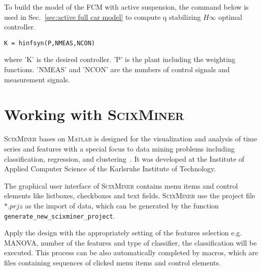 To build the model of the \ac{FCM} with active suspension, the command below is used in Sec.~\ref{sec:active full car model} to compute q stabilizing $H\infty$ optimal controller.

\begin{lstlisting}[caption={$H\infty$ controller design in Matlab},label=code:h8]
K = hinfsyn(P,NMEAS,NCON)
\end{lstlisting}

where 'K' is the desired controller.
%
'P' is the plant including the weighting functions.
%
'NMEAS' and 'NCON' are the numbers of control signals and measurement signals.

\section{Working with \textsc{ScixMiner}}

\textsc{ScixMiner} bases on \textsc{Matlab} is designed for the visualization and analysis of time series and features with a special focus to data mining problems including classification, regression, and clustering~\cite{SciXMiner}.
%
It was developed at the Institute of Applied Computer Science of the Karlsruhe Institute of Technology.

The graphical user interface of \textsc{ScixMiner} contains menu items and control elements like listboxes, checkboxes and text fields.
%
\textsc{ScixMiner} use the project file $*.prjz$ as the import of data, which can be generated by the function
\texttt{generate\_new\_scixminer\_project}.

Apply the design with the appropriately setting of the features selection e.g. \ac{MANOVA}, number of the features and type of classifier, the classification will be executed.
%
This process can be also automatically completed by macros, which are files containing sequences of clicked menu items and control elements.

